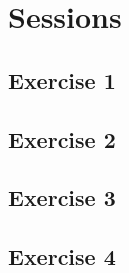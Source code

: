 \chapter{Sessions}

\section{Exercise 1}
\section{Exercise 2}
\section{Exercise 3}
\section{Exercise 4}
